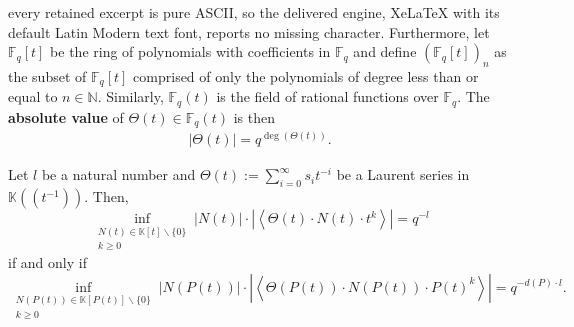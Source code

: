 \documentclass[10pt,a4paper]{amsart}
\newcommand{\F}{\mathbb{F}}
\newcommand{\K}{\mathbb{K}}
\newcommand{\N}{\mathbb{N}}
\begin{document}
every retained excerpt is pure ASCII, so the delivered engine, XeLaTeX with its default Latin Modern text font, reports no missing character.
 \noindent Furthermore, let $\F_q[t]$ be the ring of polynomials with coefficients in $\F_q$ and define $(\F_q[t])_n$ as the subset of $\F_q[t]$ comprised of only the polynomials of degree less than or equal to $n\in\N$. Similarly, ${\F_q}(t)$ is the field of rational functions over ${\F_q}$. The \textbf{absolute value} of $\Theta(t)\in{\F_q}(t)$ is then \begin{align}|\Theta(t)|=q^{\deg(\Theta(t))}.\label{absv}\end{align} 

   \begin{lemma}
   \label{lemma4} Let $l$ be a natural number and $\Theta(t):=\sum_{i=0}^\infty s_it^{-i}$ be a Laurent series in $\K\!\left(\!\left(t^{-1}\right)\!\right)$. Then,\begin{equation}     \inf_{\substack{N(t)\in\K[t]\backslash\{0\}\\k\ge0}} |N(t)|\cdot\left|\left\langle\Theta(t)\cdot N(t) \cdot t^k\right\rangle\right|=q^{-l} \label{inf2}
   \end{equation} if and only if \begin{equation}
       \inf_{\substack{N(P(t))\in\K[P(t)]\backslash\{0\}\\k\ge0}} |N(P(t))|\cdot\left|\left\langle\Theta(P(t))\cdot N(P(t)) \cdot P(t)^k\right\rangle\right|=q^{-d(P)\cdot l}.\label{inf5}
   \end{equation} 
\end{lemma}
\end{document}
